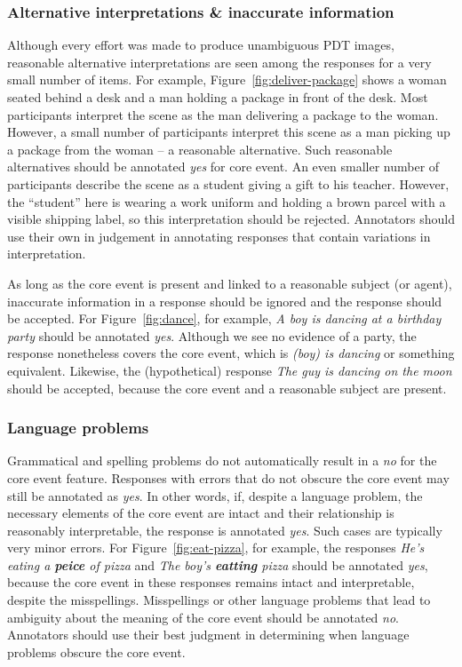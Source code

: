 \documentclass[12pt]{article}
\begin{document}
\subsubsection{Alternative interpretations \& inaccurate information} Although every effort was made to produce unambiguous PDT images, reasonable alternative interpretations are seen among the responses for a very small number of items. For example, Figure~\ref{fig:deliver-package} shows a woman seated behind a desk and a man holding a package in front of the desk. Most participants interpret the scene as the man delivering a package to the woman. However, a small number of participants interpret this scene as a man picking up a package from the woman -- a reasonable alternative. Such reasonable alternatives should be annotated \textit{yes} for core event. An even smaller number of participants describe the scene as a student giving a gift to his teacher. However, the ``student'' here is wearing a work uniform and holding a brown parcel with a visible shipping label, so this interpretation should be rejected. Annotators should use their own in judgement in annotating responses that contain variations in interpretation.

As long as the core event is present and linked to a reasonable subject (or agent), inaccurate information in a response should be ignored and the response should be accepted. For Figure~\ref{fig:dance}, for example, \textit{A boy is dancing at a birthday party} should be annotated \textit{yes}. Although we see no evidence of a party, the response nonetheless covers the core event, which is \textit{(boy) is dancing} or something equivalent. Likewise, the (hypothetical) response \textit{The guy is dancing on the moon} should be accepted, because the core event and a reasonable subject are present.

\subsubsection{Language problems} Grammatical and spelling problems do not automatically result in a \textit{no} for the core event feature. Responses with errors that do not obscure the core event may still be annotated as \textit{yes}. In other words, if, despite a language problem, the necessary elements of the core event are intact and their relationship is reasonably interpretable, the response is annotated \textit{yes}. Such cases are typically very minor errors. For Figure~\ref{fig:eat-pizza}, for example, the responses \textit{He's eating a \textbf{peice} of pizza} and \textit{The boy's \textbf{eatting} pizza} should be annotated \textit{yes}, because the core event in these responses remains intact and interpretable, despite the misspellings. Misspellings or other language problems that lead to ambiguity about the meaning of the core event should be annotated \textit{no}. Annotators should use their best judgment in determining when language problems obscure the core event.
\end{document}
